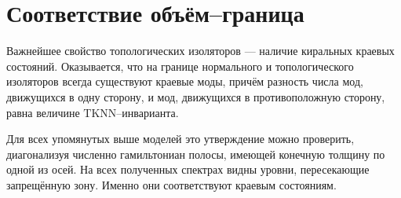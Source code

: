 \section{Соответствие объём--граница}
Важнейшее свойство топологических изоляторов --- наличие киральных краевых состояний.
Оказывается, что на границе нормального и топологического изоляторов всегда существуют
краевые моды, причём разность числа мод, движущихся в одну сторону, и мод, движущихся в 
противоположную сторону, равна величине $\mathrm{TKNN}$--инварианта. 

Для всех упомянутых выше моделей это утверждение можно проверить, диагонализуя 
численно гамильтониан полосы, имеющей конечную толщину по одной из осей.
На всех полученных спектрах видны уровни, пересекающие запрещённую зону. Именно 
они соответствуют краевым состояниям.

